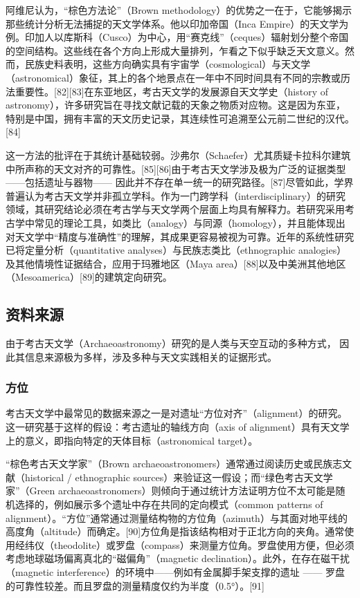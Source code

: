 阿维尼认为，“棕色方法论”（Brown methodology）的优势之一在于，它能够揭示那些统计分析无法捕捉的天文学体系。他以印加帝国（Inca Empire）的天文学为例。印加人以库斯科（Cusco）为中心，用“赛克线”（ceques）辐射划分整个帝国的空间结构。这些线在各个方向上形成大量排列，乍看之下似乎缺乏天文意义。然而，民族史料表明，这些方向确实具有宇宙学（cosmological）与天文学（astronomical）象征，其上的各个地景点在一年中不同时间具有不同的宗教或历法重要性。[82][83]在东亚地区，考古天文学的发展源自天文学史（history of astronomy），许多研究旨在寻找文献记载的天象之物质对应物。这是因为东亚，特别是中国，拥有丰富的天文历史记录，其连续性可追溯至公元前二世纪的汉代。[84]

这一方法的批评在于其统计基础较弱。沙弗尔（Schaefer）尤其质疑卡拉科尔建筑中所声称的天文对齐的可靠性。[85][86]由于考古天文学涉及极为广泛的证据类型——包括遗址与器物—— 因此并不存在单一统一的研究路径。[87]尽管如此，学界普遍认为考古天文学并非孤立学科。作为一门跨学科（interdisciplinary）的研究领域，其研究结论必须在考古学与天文学两个层面上均具有解释力。若研究采用考古学中常见的理论工具，如类比（analogy）与同源（homology），并且能体现出对天文学中“精度与准确性”的理解，其成果更容易被视为可靠。近年的系统性研究已将定量分析（quantitative analyses）与民族志类比（ethnographic analogies）及其他情境性证据结合，应用于玛雅地区（Maya area）[88]以及中美洲其他地区（Mesoamerica）[89]的建筑定向研究。
\subsection{资料来源}
由于考古天文学（Archaeoastronomy）研究的是人类与天空互动的多种方式，  
因此其信息来源极为多样，涉及多种与天文实践相关的证据形式。
\subsubsection{方位}
考古天文学中最常见的数据来源之一是对遗址“方位对齐”（alignment）的研究。这一研究基于这样的假设：考古遗址的轴线方向（axis of alignment）具有天文学上的意义，即指向特定的天体目标（astronomical target）。  

“棕色考古天文学家”（Brown archaeoastronomers）通常通过阅读历史或民族志文献（historical / ethnographic sources）来验证这一假设；而“绿色考古天文学家”（Green archaeoastronomers）则倾向于通过统计方法证明方位不太可能是随机选择的，例如展示多个遗址中存在共同的定向模式（common patterns of alignment）。“方位”通常通过测量结构物的方位角（azimuth）与其面对地平线的高度角（altitude）而确定。[90]方位角是指该结构相对于正北方向的夹角。通常使用经纬仪（theodolite）或罗盘（compass）来测量方位角。罗盘使用方便，但必须考虑地球磁场偏离真北的“磁偏角”（magnetic declination）。此外，在存在磁干扰（magnetic interference）的环境中——例如有金属脚手架支撑的遗址 —— 罗盘的可靠性较差。而且罗盘的测量精度仅约为半度（0.5°）。[91]  

